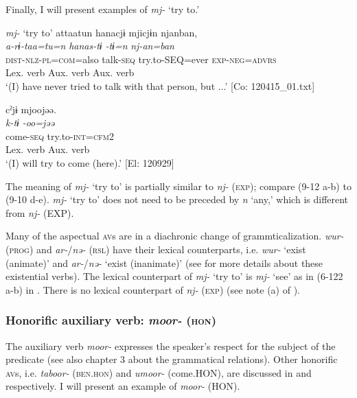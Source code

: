   Finally, I will present examples of \textit{mj-} ‘try to.’

\ea   \textit{mj-} ‘try to’ \label{ex:9.12}
\ea \label{ex:9.12a}%
 \gllll  attaatun  hanacjɨ  mjicjɨn  njanban,\\
      \textit{a-rɨ-taa=tu=n}  \textit{hanas-tɨ}  \textit{-tɨ=n}  \textit{nj-an=ban}\\
      \textsc{dist}-\textsc{nlz}-\textsc{pl}=\textsc{com}=also  talk-\textsc{seq}  try.to-SEQ=ever  \textsc{exp}-\textsc{neg}=\textsc{advrs}\\
        {Lex. verb}  {Aux. verb}  {Aux. verb}\\
      \glt       ‘(I) have never tried to talk with that person, but ...’ [Co: 120415\_01.txt]

\ex \label{ex:9.12b} %
     \gllll  cˀjɨ  mjoojəə.\\
      \textit{k-tɨ}  \textit{-oo=jəə}\\
      come-\textsc{seq}  try.to-\textsc{int}=\textsc{cfm}2\\
      {Lex. verb}  {Aux. verb}\\
      \glt       ‘(I) will try to come (here).’ [El: 120929]
     \z
\z

The meaning of \textit{mj-} ‘try to’ is partially similar to \textit{nj-} (\textsc{exp}); compare (9-12 a-b) to (9-10 d-e). \textit{mj-} ‘try to’ does not need to be preceded by \textit{n} ‘any,’ which is different from \textit{nj-} (EXP).

  Many of the aspectual \textsc{av}s are in a diachronic change of grammticalization. \textit{wur-} (\textsc{prog}) and \textit{ar-}/\textit{nə-} (\textsc{rsl}) have their lexical counterparts, i.e. \textit{wur-} ‘exist (animate)’ and \textit{ar-}/\textit{nə-} ‘exist (inanimate)’ (see  for more details about these existential verbs). The lexical counterpart of \textit{mj-} ‘try to’ is \textit{mj-} ‘see’ as in (6-122 a-b) in . There is no lexical counterpart of \textit{nj-} (\textsc{exp}) (see note (a) of ).

\subsubsection{Honorific auxiliary verb: \textit{moor-} (\textsc{hon})}\label{sec:9.1.1.2}

The auxiliary verb \textit{moor-} expresses the speaker’s respect for the subject of the predicate (see also chapter 3 about the grammatical relations). Other honorific \textsc{av}s, i.e. \textit{taboor-} (\textsc{ben}.\textsc{hon}) and \textit{umoor-} (come.HON), are discussed in  and  respectively. I will present an example of \textit{moor-} (HON).


